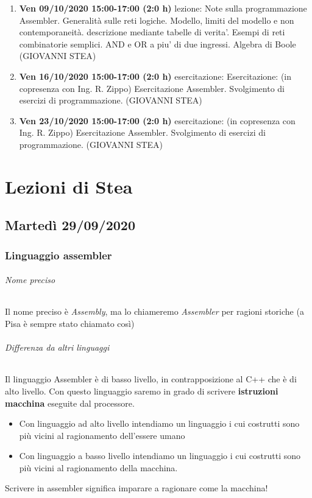 \documentclass[11pt]{report}
\begin{document}
\begin{enumerate}
\item \textbf{Ven 09/10/2020 15:00-17:00 (2:0 h)} lezione: Note sulla programmazione Assembler. Generalità sulle reti logiche. Modello, limiti del modello e non contemporaneità. descrizione mediante tabelle di verita'. Esempi di reti combinatorie semplici. AND e OR a piu' di due ingressi. Algebra di Boole (GIOVANNI STEA)
\item \textbf{Ven 16/10/2020 15:00-17:00 (2:0 h)} esercitazione: Esercitazione: (in copresenza con Ing. R. Zippo) Esercitazione Assembler. Svolgimento di esercizi di programmazione. (GIOVANNI STEA)
\item \textbf{Ven 23/10/2020 15:00-17:00 (2:0 h)} esercitazione: (in copresenza con Ing. R. Zippo) Esercitazione Assembler. Svolgimento di esercizi di programmazione. (GIOVANNI STEA)
\end{enumerate}
\normalsize
\part{Lezioni di Stea}



\chapter{Martedì 29/09/2020}


\section{Linguaggio assembler}
\paragraph{Nome preciso} Il nome preciso è \emph{Assembly}, ma lo chiameremo \emph{Assembler} per ragioni storiche (a Pisa è sempre stato chiamato così)
\paragraph{Differenza da altri linguaggi} Il linguaggio Assembler è di basso livello, in contrapposizione al C++ che è di alto livello. Con questo linguaggio saremo in grado di scrivere \textbf{istruzioni macchina} eseguite dal processore.
\begin{itemize}
\item Con linguaggio ad alto livello intendiamo un linguaggio i cui costrutti sono più vicini al ragionamento dell'essere umano
\item Con linguaggio a basso livello intendiamo un linguaggio i cui costrutti sono più vicini al ragionamento della macchina.
\end{itemize}
Scrivere in assembler significa imparare a ragionare come la macchina!
\end{document}
